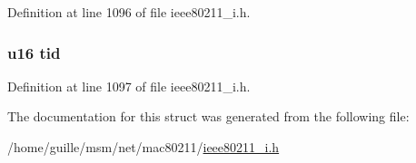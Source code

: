 Definition at line 1096 of file ieee80211\-\_\-i.\-h.

\hypertarget{structieee80211__ra__tid_a7c32a30e0eb9aa589f779888e3d5ba40}{
\subsubsection[{tid}]{\setlength{\rightskip}{0pt plus 5cm}u16 tid}}\label{structieee80211__ra__tid_a7c32a30e0eb9aa589f779888e3d5ba40}


Definition at line 1097 of file ieee80211\-\_\-i.\-h.



The documentation for this struct was generated from the following file\-:\begin{DoxyCompactItemize}
\item 
/home/guille/msm/net/mac80211/\hyperlink{ieee80211__i_8h}{ieee80211\-\_\-i.\-h}\end{DoxyCompactItemize}
